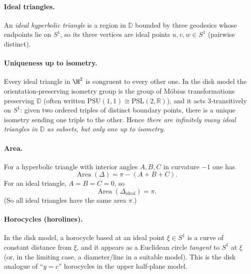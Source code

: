\documentclass[12pt,a4paper]{article}
\newcommand{\R}{\mathbb{R}}
\newcommand{\DD}{\mathbb{D}}
\theoremstyle{plain}
\theoremstyle{definition}      %
\begin{document}
	\paragraph{Ideal triangles.}
	An \emph{ideal hyperbolic triangle} is a region in $\DD$ bounded by three geodesics whose endpoints lie on $S^1$,
	so its three vertices are ideal points $u,v,w\in S^1$ (pairwise distinct).
	
	\paragraph{Uniqueness up to isometry.}
	Every ideal triangle in $\H^2$ is congruent to every other one. In the disk model the orientation-preserving isometry group
	is the group of M\"obius transformations preserving $\DD$ (often written $\mathrm{PSU}(1,1)\cong \mathrm{PSL}(2,\R)$),
	and it acts $3$-transitively on $S^1$: given two ordered triples of distinct boundary points, there is a unique isometry sending
	one triple to the other. Hence \emph{there are infinitely many ideal triangles in $\DD$ as subsets, but only one up to isometry.}
	
	\paragraph{Area.}
	For a hyperbolic triangle with interior angles $A,B,C$ in curvature $-1$ one has
	\[
	\operatorname{Area}(\Delta)=\pi-(A+B+C).
	\]
	For an ideal triangle, $A=B=C=0$, so
	\[
	\operatorname{Area}(\Delta_{\mathrm{ideal}})=\pi.
	\]
	(So all ideal triangles have the same area $\pi$.)
	
	\paragraph{Horocycles (horolines).}
	In the disk model, a horocycle based at an ideal point $\xi\in S^1$ is a curve of constant distance from $\xi$,
	and it appears as a Euclidean circle \emph{tangent} to $S^1$ at $\xi$ (or, in the limiting case, a diameter/line in a suitable model).
	This is the disk analogue of ``$y=c$'' horocycles in the upper half-plane model.
	
\end{document}
